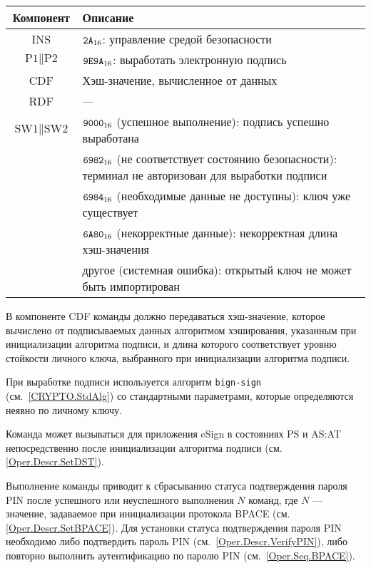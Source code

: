 \noindent
\begin{tabular}{|c|p{14cm}|}
\hline
Компонент & Описание\\ 
\hline
\hline
INS & $\texttt{2A}_{16}$: управление средой безопасности \\
\hline
$\text{P1} \parallel \text{P2}$ & $\texttt{9E9A}_{16}$: выработать
электронную подпись \\ 
\hline
CDF & Хэш-значение, вычисленное от данных\\
\hline \hline
RDF &  --- \\
\hline
$\text{SW1} \parallel \text{SW2}$ & $\texttt{9000}_{16}$ 
(успешное выполнение): подпись успешно выработана \\
 & $\texttt{6982}_{16}$ (не соответствует состоянию безопасности): терминал не 
авторизован для выработки подписи\\
 & $\texttt{6984}_{16}$ (необходимые данные не доступны): ключ уже существует\\
 & $\texttt{6A80}_{16}$ (некорректные данные): некорректная длина
хэш-значения \\
 & другое (системная ошибка): открытый ключ не может быть импортирован\\
\hline
\end{tabular}

В компоненте CDF команды должно передаваться хэш-значение, которое вычислено
от подписываемых данных алгоритмом хэширования, указанным 
при инициализации алгоритма подписи, и длина которого соответствует
уровню стойкости личного ключа, выбранного при инициализации алгоритма подписи.

При выработке подписи используется алгоритм \texttt{bign-sign}
(см.~\ref{CRYPTO.StdAlg}) со стандартными параметрами, 
которые определяются неявно по личному ключу.  


Команда может вызываться для приложения eSign в состояниях 
PS и AS:AT непосредственно после инициализации алгоритма подписи
(см. \ref{Oper.Descr.SetDST}).

Выполнение команды приводит к сбрасыванию статуса подтверждения пароля PIN
после успешного или неуспешного выполнения $N$ команд, где $N$ --- значение, 
задаваемое при инициализации протокола BPACE (см. \ref{Oper.Descr.SetBPACE}).
Для установки статуса подтверждения пароля PIN 
необходимо либо подтвердить пароль PIN (см.~\ref{Oper.Descr.VerifyPIN}), 
либо повторно выполнить аутентификацию по паролю PIN (см.~\ref{Oper.Seq.BPACE}).

